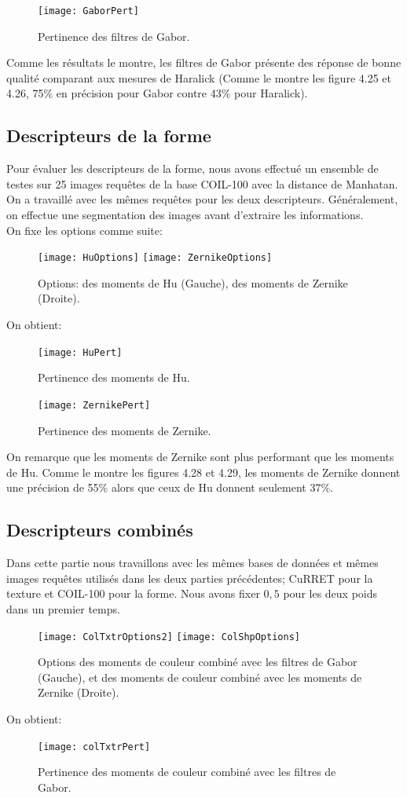 \begin{figure}[H]
	\centering
	\texttt{[image: GaborPert]} 
	\caption{Pertinence des filtres de Gabor.}
\end{figure}
Comme les résultats le montre, les filtres de Gabor présente des réponse de bonne qualité comparant aux mesures de Haralick (Comme le montre les figure 4.25 et 4.26, 75\% en précision pour Gabor contre 43\% pour Haralick). 
\subsection{Descripteurs de la forme}
Pour évaluer les descripteurs de la forme, nous avons effectué un ensemble de testes sur 25 images requêtes de la base COIL-100 avec la distance de Manhatan. On a travaillé avec les mêmes requêtes pour les deux descripteurs. Généralement, on effectue une segmentation des images avant d'extraire les informations.\\

On fixe les options comme suite:
\begin{figure}[H]
	\centering
	\texttt{[image: HuOptions]} \space
	\texttt{[image: ZernikeOptions]} 
	\caption{Options: des moments de Hu (Gauche), des moments de Zernike (Droite).}
\end{figure}
On obtient:
\begin{figure}[H]
	\centering
	\texttt{[image: HuPert]} 
	\caption{Pertinence des moments de Hu.}
\end{figure}

\begin{figure}[H]
	\centering
	\texttt{[image: ZernikePert]} 
	\caption{Pertinence des moments de Zernike.}
\end{figure}
On remarque que les moments de Zernike sont plus performant que les moments de Hu. Comme le montre les figures 4.28 et 4.29, les moments de Zernike donnent une précision de 55\% alors que ceux de Hu donnent seulement 37\%.
\subsection{Descripteurs combinés}
Dans cette partie nous travaillons avec les mêmes bases de données et mêmes images requêtes utilisés dans les deux parties précédentes; CuRRET pour la texture et COIL-100 pour la forme. Nous avons fixer $  0,5 $ pour les deux poids dans un premier temps.
\begin{figure}[H]
	\centering
	\texttt{[image: ColTxtrOptions2]} \space
	\texttt{[image: ColShpOptions]} 
	\caption{Options des moments de couleur combiné avec les filtres de Gabor (Gauche), et des moments de couleur combiné avec les moments de Zernike (Droite).}
\end{figure}
On obtient:
\begin{figure}[H]
	\centering
	\texttt{[image: colTxtrPert]} 
	\caption{Pertinence des moments de couleur combiné avec les filtres de Gabor.}
\end{figure}

